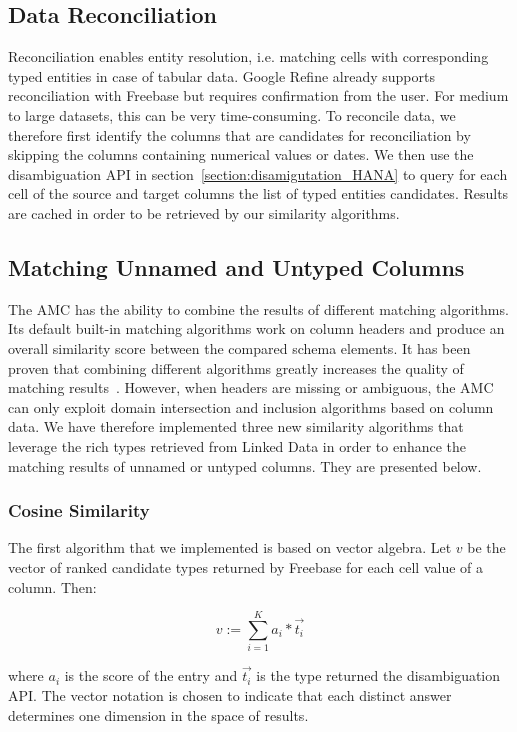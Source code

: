\subsection{Data Reconciliation}
Reconciliation enables entity resolution, i.e. matching cells with corresponding typed entities in case of tabular data. Google Refine already supports reconciliation with Freebase but requires confirmation from the user. For medium to large datasets, this can be very time-consuming. To reconcile data, we therefore first identify the columns that are candidates for reconciliation by skipping the columns containing numerical values or dates. We then use the disambiguation API in section~\ref{section:disamigutation_HANA} to query for each cell of the source and target columns the list of typed entities candidates. Results are cached in order to be retrieved by our similarity algorithms.

\subsection{Matching Unnamed and Untyped Columns}

The AMC has the ability to combine the results of different matching algorithms. Its default built-in matching algorithms work on column headers and produce an overall similarity score between the compared schema elements. It has been proven that combining different algorithms greatly increases the quality of matching results~\cite{Peukert:ICDE:12}\cite{conf/wise/StracciaT05}. However, when headers are missing or ambiguous, the AMC can only exploit domain intersection and inclusion algorithms based on column data. We have therefore implemented three new similarity algorithms that leverage the rich types retrieved from Linked Data in order to enhance the matching results of unnamed or untyped columns. They are presented below.


\subsubsection{Cosine Similarity}
The first algorithm that we implemented is based on vector algebra. Let $v$ be the vector of ranked candidate types returned by Freebase for each cell value of a column. Then:

\begin{equation}\label{equation:equation_3}
v:=\sum^K_{i=1}{a_i}*\overrightarrow{t_i}
\end{equation}

where $a_i$ is the score of the entry and $\overrightarrow{t_i}$ is the type returned the disambiguation API. The vector notation is chosen to indicate that each distinct answer determines one dimension in the space of results.


